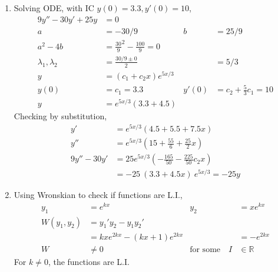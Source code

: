 \begin{enumerate}
    \item Solving ODE, with IC $ y(0) = 3.3, y'(0) = 10 $,
          \begin{align}
              9y'' - 30y' + 25y        & = 0                                      \\
              a                        & = -30/9                                &
              b                        & = 25/9                                   \\
              a^{2} - 4b               & = \frac{30}{9}^{2} - \frac{100}{9} = 0   \\
              \lambda_{1}, \lambda_{2} & = \frac{30/9 \pm 0}{2}                 &
                                       & = 5/3                                    \\
              y                        & = (c_{1}+ c_{2}x)e^{5x/3}                \\
              y(0)                     & = c_{1} = 3.3                          &
              y'(0)                    & = c_{2} + \frac{5}{3}c_{1} = 10          \\
              y                        & = e^{5x/3}(3.3 + 4.5)
          \end{align}
          Checking by substitution,
          \begin{align}
              y'         & = e^{5x/3}\left( 4.5 + 5.5 + 7.5x \right) \\
              y''        & = e^{5x/3}\left( 15 + \frac{55}{6}
              + \frac{25}{2}x \right)                                \\
              9y''- 30y' & = 25e^{5x/3}\left( - \frac{165}{50}
              - \frac{225}{50} c_{2}x \right)                        \\
                         & = -25\ (3.3 + 4.5x)\ e^{5x/3} = -25y
          \end{align}

    \item Using Wronskian to check if functions are L.I.,
          \begin{align}
              y_{1}                   & = e^{kx}                      &
              y_{2}                   & = xe^{kx}                       \\
              W(y_{1}, y_{2})         & = y_{1}'y_{2} - y_{1}y_{2}'     \\
                                      & = kxe^{2kx} - (kx + 1)e^{2kx} &
                                      & =-e^{2kx}                       \\
              W                       & \neq 0                        &
              \text{for some} \quad I & \in \mathbb{R}
          \end{align}
          For $ k \neq 0 $, the functions are L.I.


\end{enumerate}

